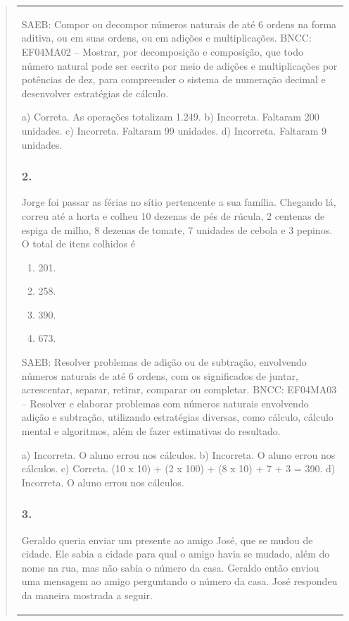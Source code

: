 \begin{mdframed}[linewidth=2pt,linecolor=salmao,roundcorner=2pt]
\begin{itemize}
{\begin{itemize}
\begin{escolha}
{\begin{quote}
{\begin{escolha}
{{{{{\begin{longtable}[]{@{}l@{}}
\begin{itemize}
{SAEB: Compor ou decompor números naturais de até 6 ordens na
forma aditiva, ou em suas ordens, ou em adições e multiplicações.
BNCC: EF04MA02 -- Mostrar, por decomposição e composição, que todo número natural pode ser escrito
por meio de adições e multiplicações por potências de dez, para compreender o sistema de
numeração decimal e desenvolver estratégias de cálculo.

a) Correta. As operações totalizam 1.249.
b) Incorreta. Faltaram 200 unidades.
c) Incorreta. Faltaram 99 unidades.
d) Incorreta. Faltaram 9 unidades.

\subsubsection{2. }

Jorge foi passar as férias no sítio pertencente a sua família. Chegando lá,
correu até a horta e colheu 10 dezenas de pés de rúcula, 2 centenas de
espiga de milho, 8 dezenas de tomate, 7 unidades de cebola e 3 pepinos.
O total de itens colhidos é

\begin{enumerate}
\item
  201.
\item
  258.
\item
  390.
\item
  673.
\end{enumerate}

SAEB: Resolver problemas de adição ou de subtração,
envolvendo números naturais de até 6 ordens, com os significados de
juntar, acrescentar, separar, retirar, comparar ou completar.
BNCC: EF04MA03 -- Resolver e elaborar problemas com números naturais envolvendo adição e subtração,
utilizando estratégias diversas, como cálculo, cálculo mental e algoritmos, além de fazer estimativas
do resultado.

a) Incorreta. O aluno errou nos cálculos.
b) Incorreta. O aluno errou nos cálculos.
c) Correta. (10 x 10) + (2 x 100) + (8 x 10) + 7 + 3 = 390.
d) Incorreta. O aluno errou nos cálculos.

\subsubsection{3. }

Geraldo queria enviar um presente ao amigo José, que se mudou de cidade. Ele
sabia a cidade para qual o amigo havia se mudado, além do nome na rua, mas
não sabia o número da casa. Geraldo então enviou uma mensagem ao
amigo perguntando o número da casa. José respondeu da maneira mostrada a seguir.

}
\end{itemize}
\end{longtable}}}}}}
\end{escolha}}
\end{quote}}
\end{escolha}
\end{itemize}}
\end{itemize}
\end{mdframed}

